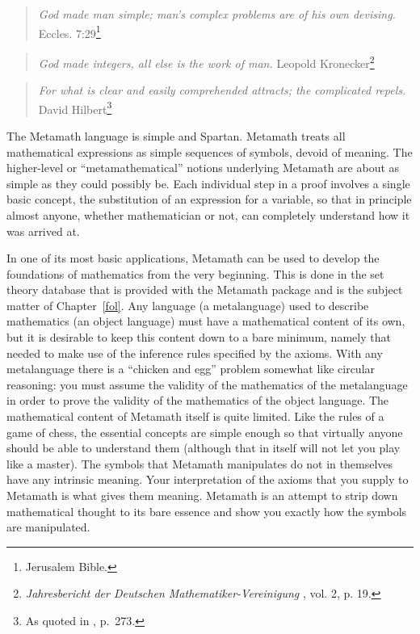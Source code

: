 \begin{quote}
  {\em God made man simple; man's complex problems are of his own
  devising.}
    \flushright\sc Eccles. 7:29\footnote{Jerusalem Bible.}\\
\end{quote}

\begin{quote}
  {\em God made integers, all else is the work of man.}
    \flushright\sc Leopold Kronecker\footnote{{\em Jahresbericht
	der Deutschen Mathematiker-Vereinigung }, vol. 2, p. 19.}\\
\end{quote}

\begin{quote}
  {\em For what is clear and easily comprehended attracts; the
  complicated repels.}
    \flushright\sc David Hilbert\footnote{As quoted in \cite{deMillo},
p.~273.}\\
\end{quote}

The Metamath language is simple and Spartan.  Metamath treats
all mathematical expressions as simple sequences of symbols, devoid of meaning.
The higher-level or ``metamathematical'' notions underlying Metamath are about
as simple as they could possibly be.  Each individual step in a proof involves
a single basic concept, the substitution of an expression for a variable, so
that in principle almost anyone, whether mathematician or not, can
completely understand how it was arrived at.

In one of its most basic applications, Metamath can be used to
develop the foundations of mathematics from
the very beginning.  This is done in the set theory database that is provided
with the Metamath package and is the subject matter
of Chapter~\ref{fol}. Any language (a metalanguage)
used to describe mathematics (an object language) must
have a mathematical content of its own, but it is desirable to keep this
content down to a bare minimum, namely that needed to make use of the
inference rules specified by the axioms.  With any metalanguage there is a
``chicken and egg'' problem somewhat like circular reasoning:  you must assume
the validity of the mathematics of the metalanguage in order to prove the
validity of the mathematics of the object language.  The mathematical content
of Metamath itself is quite limited.  Like the rules of a game of chess, the
essential concepts are simple enough so that virtually anyone should be able to
understand them (although that in itself will not let you play like
a master).  The symbols that Metamath manipulates do not in themselves
have any intrinsic meaning.  Your interpretation of the axioms that you supply
to Metamath is what gives them meaning.  Metamath is an attempt to strip down
mathematical thought to its bare essence and show you exactly how the symbols
are manipulated.

